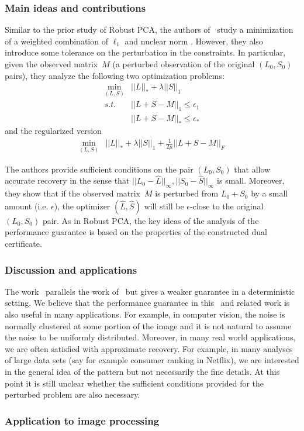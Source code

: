 \subsubsection{Main ideas and contributions}
%
Similar to the prior study of Robust PCA, the authors of~\cite{Hsu:2011ys} study a minimization
of a weighted combination of $\ell_{1}$ and nuclear norm . However, they also introduce some tolerance on the perturbation in the constraints. In particular, given the observed matrix~$M$ (a perturbed observation of the original $(L_{0},S_{0})$ pairs), they analyze the following two optimization problems: %
%
\begin{eqnarray}
\min_{(L,S)} & ||L||_{*}+\lambda||S||_{1}\nonumber \\
s.t. & ||L+S-M||_{1}\le\epsilon_{1}\\
 & ||L+S-M||_{*}\le\epsilon_{*}\nonumber
\end{eqnarray}
%
and the regularized version
\begin{eqnarray}
\min_{(L,S)} & ||L||_{*}+\lambda||S||_{1}+\frac{1}{2\mu}||L+S-M||_{F}
\end{eqnarray}


The authors provide sufficient conditions on the pair $(L_{0},S_{0})$ that allow accurate recovery in the sense that $||L_{0}-\hat{L}||_{\infty},||S_{0}-\hat{S}||_{\infty}$ is small. Moreover, they show that if the observed matrix~$M$ is perturbed from $L_{0}+S_{0}$ by a small amount (i.e. $\epsilon$), the optimizer $(\hat{L},\hat{S})$ will still be $\epsilon$-close to the original $(L_{0},S_{0})$ pair. As in Robust PCA, the key ideas of the analysis of the performance guarantee is based on the properties of the constructed dual certificate.

\subsubsection{Discussion and applications}
The work~\cite{Hsu:2011ys} parallels the work of~\cite{Candes:2011fk} but gives a weaker guarantee in a deterministic setting. %
We believe that the performance guarantee in this~\cite{Hsu:2011ys} and related work is also useful in many applications. For example, in computer vision, the noise  is normally clustered at some portion of the image and it is not natural to assume the noise to be uniformly distributed. Moreover, in many real world applications, we are often satisfied with approximate recovery. %
For example, in many analyses of large data sets (say for example consumer ranking in Netflix), we are interested in the general idea of the pattern but not necessarily the fine details. At this point it is still unclear whether the sufficient conditions provided for the perturbed problem are also necessary. %




\subsubsection{Application to image processing}



